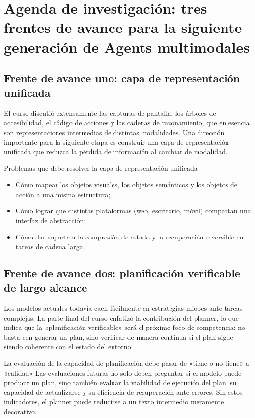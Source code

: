 \section{Agenda de investigación: tres frentes de avance para la siguiente generación de Agents multimodales}

\subsection{Frente de avance uno: capa de representación unificada}
El curso discutió extensamente las capturas de pantalla, los árboles de accesibilidad, el código de acciones y las cadenas de razonamiento, que en esencia son representaciones intermedias de distintas modalidades. Una dirección importante para la siguiente etapa es construir una capa de representación unificada que reduzca la pérdida de información al cambiar de modalidad.

\begin{knowledgebox}{Problemas que debe resolver la capa de representación unificada}
\begin{itemize}
    \item Cómo mapear los objetos visuales, los objetos semánticos y los objetos de acción a una misma estructura;
    \item Cómo lograr que distintas plataformas (web, escritorio, móvil) compartan una interfaz de abstracción;
    \item Cómo dar soporte a la compresión de estado y la recuperación reversible en tareas de cadena larga.
\end{itemize}
\end{knowledgebox}

\subsection{Frente de avance dos: planificación verificable de largo alcance}
Los modelos actuales todavía caen fácilmente en estrategias miopes ante tareas complejas. La parte final del curso enfatizó la contribución del planner, lo que indica que la «planificación verificable» será el próximo foco de competencia: no basta con generar un plan, sino verificar de manera continua si el plan sigue siendo coherente con el estado del entorno.

\begin{importantbox}{La evaluación de la capacidad de planificación debe pasar de «tiene o no tiene» a «calidad»}
Las evaluaciones futuras no solo deben preguntar si el modelo puede producir un plan, sino también evaluar la viabilidad de ejecución del plan, su capacidad de actualizarse y su eficiencia de recuperación ante errores. Sin estos indicadores, el planner puede reducirse a un texto intermedio meramente decorativo.
\end{importantbox}

